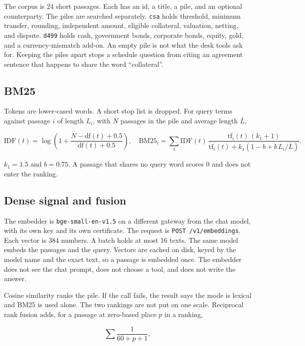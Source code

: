 \documentclass[11pt,a4paper]{article}
\begin{document}
The corpus is 24 short passages. Each has an id, a title, a pile, and an optional counterparty. The piles are searched separately. \texttt{csa} holds threshold, minimum transfer, rounding, independent amount, eligible collateral, valuation, netting, and dispute. \texttt{d499} holds cash, government bonds, corporate bonds, equity, gold, and a currency-mismatch add-on. An empty pile is not what the desk tools ask for. Keeping the piles apart stops a schedule question from citing an agreement sentence that happens to share the word ``collateral''.

\subsection{BM25}

Tokens are lower-cased words. A short stop list is dropped. For query terms against passage $i$ of length $L_i$, with $N$ passages in the pile and average length $\bar L$,

\begin{equation}
\mathrm{IDF}(t)=\log\left(1+\frac{N-\mathrm{df}(t)+0.5}{\mathrm{df}(t)+0.5}\right),
\quad
\mathrm{BM25}_i=\sum_{t} \mathrm{IDF}(t)\,
\frac{\mathrm{tf}_{i}(t)\,(k_1+1)}{\mathrm{tf}_{i}(t)+k_1\left(1-b+b\,L_i/\bar L\right)}.
\end{equation}

$k_1=1.5$ and $b=0.75$. A passage that shares no query word scores 0 and does not enter the ranking.

\subsection{Dense signal and fusion}

The embedder is \texttt{bge-small-en-v1.5} on a different gateway from the chat model, with its own key and its own certificate. The request is \texttt{POST /v1/embeddings}. Each vector is 384 numbers. A batch holds at most 16 texts. The same model embeds the passages and the query. Vectors are cached on disk, keyed by the model name and the exact text, so a passage is embedded once. The embedder does not see the chat prompt, does not choose a tool, and does not write the answer.

Cosine similarity ranks the pile. If the call fails, the result says the mode is lexical and BM25 is used alone. The two rankings are not put on one scale. Reciprocal rank fusion adds, for a passage at zero-based place $p$ in a ranking,

\begin{equation}
\sum \frac{1}{60+p+1},
\end{equation}
\end{document}

